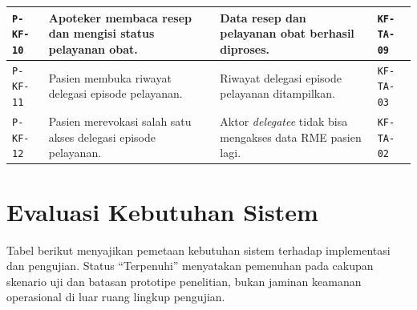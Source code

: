 \documentclass[bahasa, 12pt, a4paper, onecolumn, oneside, final]{report}
\begin{document}
\begin{longtable}{|p{}|p{}|p{}|p{}|}
	\texttt{P-KF-10}                                                                   &
	Apoteker membaca resep dan mengisi status pelayanan obat.                          &
	Data resep dan pelayanan obat berhasil diproses.                                   &
	\texttt{KF-TA-09}                                                                                                                          \\ \hline

	\texttt{P-KF-11}                                                                   &
	Pasien membuka riwayat delegasi episode pelayanan.                                 &
	Riwayat delegasi episode pelayanan ditampilkan.                                    &
	\texttt{KF-TA-03}                                                                                                                          \\ \hline
	\texttt{P-KF-12}                                                                   &
	Pasien merevokasi salah satu akses delegasi episode pelayanan.                     &
	Aktor \textit{delegatee} tidak bisa mengakses data RME pasien lagi.                &
	\texttt{KF-TA-02}                                                                                                                          \\ \hline
\end{longtable}
\endgroup

\section{Evaluasi Kebutuhan Sistem}

Tabel berikut menyajikan pemetaan kebutuhan sistem terhadap implementasi dan pengujian. Status ``Terpenuhi'' menyatakan pemenuhan pada cakupan skenario uji dan batasan prototipe penelitian, bukan jaminan keamanan operasional di luar ruang lingkup pengujian.
\end{document}
